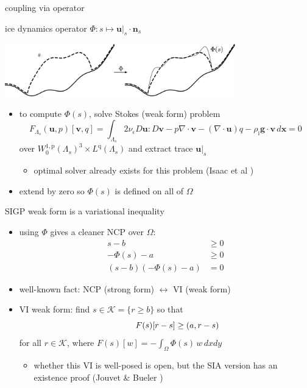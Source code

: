 \documentclass{beamer}
\newcommand{\eps}{\epsilon}
\newcommand{\Div}{\nabla\cdot}
\newcommand{\bg}{\mathbf{g}}
\newcommand{\bn}{\mathbf{n}}
\newcommand{\bu}{\mathbf{u}}
\newcommand{\bv}{\mathbf{v}}
\newcommand{\bx}{\mathbf{x}}
\newcommand{\rhoi}{\rho_{\text{i}}}
\newcommand{\ip}[2]{\left(#1,#2\right)}
\newcommand{\pp}{{\text{p}}}
\newcommand{\qq}{{\text{q}}}
\newcommand{\bus}{\bu|_s}
\begin{document}
\begin{frame}{coupling via operator}

\begin{block}{ice dynamics operator}
$\Phi : s \mapsto \bus \cdot \bn_s$

\vspace{-3mm}

\hfill \includegraphics[width=0.75\textwidth]{figs/idoaction.png}
\end{block}

\begin{itemize}
\item to compute $\Phi(s)$, solve Stokes (weak form) problem
    $$F_{\Lambda_s}(\bu,p)[\bv,q] = \int_{\Lambda_s} 2 \nu_\eps D\bu : D\bv - p \Div\bv - (\Div\bu) q - \rhoi \bg \cdot \bv\,d\bx = 0$$
over $W_0^{1,\pp}(\Lambda_s)^3 \times L^\qq(\Lambda_s)$ and extract trace $\bus$

\medskip
    \begin{itemize}
    \item optimal solver already exists for this problem (Isaac et al \cite{IsaacStadlerGhattas2015})
    \end{itemize}
\item extend by zero so $\Phi(s)$ is defined on all of $\Omega$
\end{itemize}

\end{frame}


\begin{frame}{SIGP weak form is a variational inequality}

\begin{itemize}
\item using $\Phi$ gives a cleaner NCP over $\Omega$:
\begin{align*}
s - b &\ge 0 \\
- \Phi(s) - a &\ge 0 \\
(s - b) (- \Phi(s) - a) &= 0
\end{align*}

\item well-known fact: \quad  NCP (strong form) $\leftrightarrow$ VI (weak form)
\item VI weak form: find $s \in \mathcal{K} = \{r \ge b\}$ so that
    $$\hspace{10mm} F(s)[r - s] \ge \ip{a}{r-s}$$
for all $r \in \mathcal{K}$, where $F(s)[w] = - \int_\Omega \Phi(s)\, w \,dx dy$

\medskip
    \begin{itemize}
    \item whether this VI is well-posed is open, but the SIA version has an existence proof (Jouvet \& Bueler \cite{JouvetBueler2012})
    \end{itemize}
\end{itemize}

\end{frame}
\end{document}

